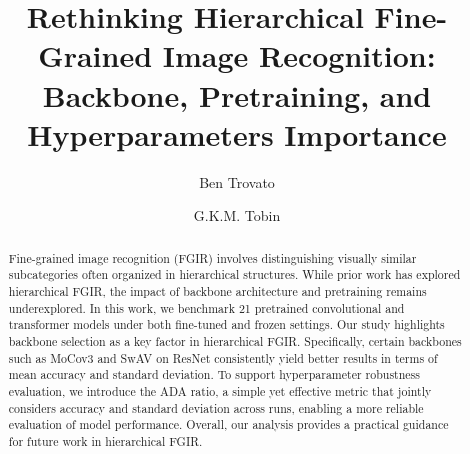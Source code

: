 \documentclass[sigconf, screen, review, anonymous]{acmart}
\begin{document}
\title[Backbone, Pretraining, and Hyperparameters for Hierarchical Recognition]{Rethinking Hierarchical Fine-Grained Image Recognition: Backbone, Pretraining, and Hyperparameters Importance}

\author{Ben Trovato}
\author{G.K.M. Tobin}
\authornotemark[1]

\renewcommand{\shortauthors}{Trovato et al.}

\begin{abstract}
Fine-grained image recognition (FGIR) involves distinguishing visually similar subcategories often organized in hierarchical structures. While prior work has explored hierarchical FGIR, the impact of backbone architecture and pretraining remains underexplored. In this work, we benchmark 21 pretrained convolutional and transformer models under both fine-tuned and frozen settings. Our study highlights backbone selection as a key factor in hierarchical FGIR. Specifically, certain backbones such as MoCov3 and SwAV on ResNet consistently yield better results in terms of mean accuracy and standard deviation. To support hyperparameter robustness evaluation, we introduce the ADA ratio, a simple yet effective metric that jointly considers accuracy and standard deviation across runs, enabling a more reliable evaluation of model performance. Overall, our analysis provides a practical guidance for future work in hierarchical FGIR.
\end{abstract}
\end{document}

